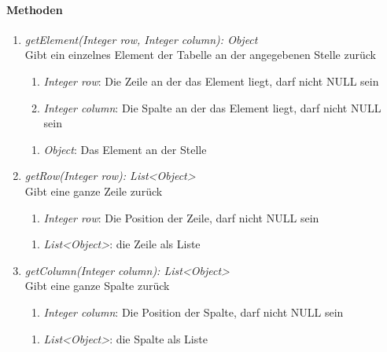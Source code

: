 \paragraph{Methoden}

\begin{enumerate}[+]
	\item \textit{getElement(Integer row, Integer column): Object} \\
	Gibt ein einzelnes Element der Tabelle an der angegebenen Stelle zurück
	\begin{enumerate}[$\bullet$]
		\item \textit{Integer row}: Die Zeile an der das Element liegt, darf nicht NULL sein
		\item \textit{Integer column}: Die Spalte an der das Element liegt, darf nicht NULL sein
	\end{enumerate}
	\vspace{-0.2cm}
	\begin{enumerate}[$\circ$]
		\item \textit{Object}: Das Element an der Stelle
	\end{enumerate}
	
	\item \textit{getRow(Integer row): List<Object>} \\
	Gibt eine ganze Zeile zurück
	\begin{enumerate}[$\bullet$]
		\item \textit{Integer row}: Die Position der Zeile, darf nicht NULL sein
	\end{enumerate}
	\vspace{-0.2cm}
	\begin{enumerate}[$\circ$]
		\item \textit{List<Object>}: die Zeile als Liste
	\end{enumerate}
	
	\item \textit{getColumn(Integer column): List<Object>} \\
	Gibt eine ganze Spalte zurück
	
	\begin{enumerate}[$\bullet$]
		\item \textit{Integer column}: Die Position der Spalte, darf nicht NULL sein
	\end{enumerate}
	\vspace{-0.2cm}
	\begin{enumerate}[$\circ$]
		\item \textit{List<Object>}: die Spalte als Liste
	\end{enumerate}
	

\end{enumerate}
